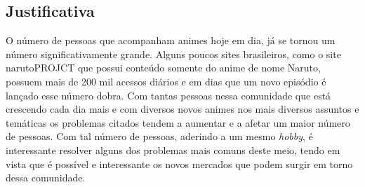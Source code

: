 \documentclass[
	12pt,				%
	openright,			%
	twoside,			%
	a4paper,			%
	Times,
	brazil,				%
	]{abntex2}
\begin{document}
\subsection{Justificativa}
O número de pessoas que acompanham animes hoje em dia, já se tornou um número significativamente grande. Alguns poucos sites brasileiros,  como o site narutoPROJCT que possui conteúdo somente do anime de nome Naruto, possuem mais de 200 mil acessos diários e em dias que um novo episódio é lançado esse número dobra. Com tantas pessoas nessa comunidade que está crescendo cada dia mais e com diversos novos animes nos mais diversos assuntos e temáticas os problemas citados tendem a aumentar e a afetar um maior número de pessoas. Com tal número de pessoas, aderindo a um mesmo \textit{hobby}, é interessante resolver alguns dos problemas mais comuns deste meio, tendo em vista que é possível e interessante os novos mercados que podem surgir em torno dessa comunidade.
\par

\end{document}
